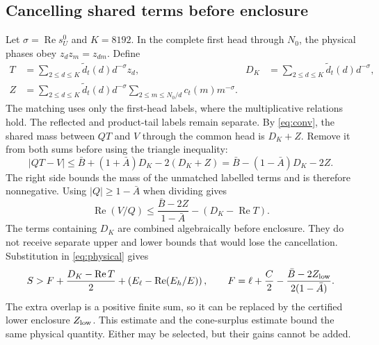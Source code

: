 \documentclass[11pt,a4paper]{article}
\theoremstyle{definition}\newtheorem{definition}[theorem]{Definition}
\theoremstyle{remark}\newtheorem{remark}[theorem]{Remark}
\newcommand{\Rea}{\operatorname{Re}}
\begin{document}
\subsection{Cancelling shared terms before enclosure}
Let $\sigma=\Rea s_U^0$ and $K=8192$. In the complete first head through
$N_0$, the physical phases obey $z_dz_m=z_{dm}$. Define
\begin{align*}
T&=\sum_{2\le d\le K}\widetilde d_t(d)d^{-\sigma}z_d,
& D_K&=\sum_{2\le d\le K}\widetilde d_t(d)d^{-\sigma},\\
Z&=\sum_{2\le d\le K}\widetilde d_t(d)d^{-\sigma}
       \sum_{2\le m\le N_0/d}c_t(m)m^{-\sigma}.&&
\end{align*}
The matching uses only the first-head labels, where the multiplicative
relations hold. The reflected and product-tail labels remain separate.
By \eqref{eq:conv}, the shared mass between $QT$ and $V$ through the common
head is $D_K+Z$. Remove it from both sums before using the triangle inequality:
\begin{equation}\label{eq:resid}
|QT-V|\le\bar B+(1+\bar A)D_K-2(D_K+Z)
=\bar B-(1-\bar A)D_K-2Z.
\end{equation}
The right side bounds the mass of the unmatched labelled terms and is
therefore nonnegative. Using $|Q|\ge1-\bar A$ when dividing gives
\begin{equation}\label{eq:quotient}
\Rea(V/Q)\le
\frac{\bar B-2Z}{1-\bar A}-(D_K-\Rea T).
\end{equation}
The terms containing $D_K$ are combined algebraically before enclosure.
They do not receive separate upper and lower bounds that would lose the
cancellation.
Substitution in \eqref{eq:physical} gives
\begin{equation}\label{eq:newS}
S>F+\frac{D_K-\Rea T}{2}+
\left(E_\ell-\Rea(E_h/E)\right),
\qquad
F=\ell+\frac C2-\frac{\bar B-2Z_{\rm low}}{2(1-\bar A)}.
\end{equation}
The extra overlap is a positive finite sum, so it can be replaced by the
certified lower enclosure $Z_{\rm low}$. This estimate and the cone-surplus
estimate bound the same physical quantity. Either may be selected, but their
gains cannot be added.
\end{document}
